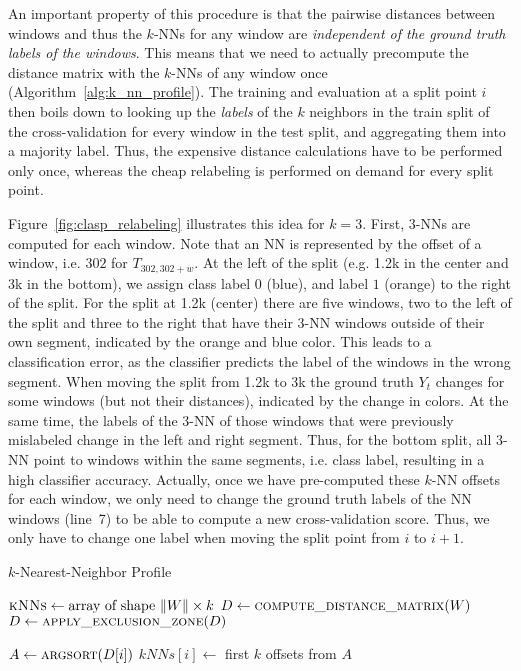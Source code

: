 \documentclass[pdflatex,sn-basic]{sn-jnl}
\begin{document}
An important property of this procedure is that the pairwise distances between windows and thus the $k$-NNs for any window are \emph{independent of the ground truth labels of the windows}. This means that we need to actually precompute the distance matrix with the $k$-NNs of any window once (Algorithm~\ref{alg:k_nn_profile}). The training and evaluation at a split point $i$ then boils down to looking up the \emph{labels} of the $k$ neighbors in the train split of the cross-validation for every window in the test split, and aggregating them into a majority label. Thus, the expensive distance calculations have to be performed only once, whereas the cheap relabeling is performed on demand for every split point.

Figure~\ref{fig:clasp_relabeling} illustrates this idea for $k=3$. First, $3$-NNs are computed for each window. Note that an NN is represented by the offset of a window, i.e. $302$ for $T_{302,302+w}$. At the left of the split (e.g. 1.2k in the center and 3k in the bottom), we assign class label $0$ (blue), and label $1$ (orange) to the right of the split. For the split at 1.2k (center) there are five windows, two to the left of the split and three to the right that have their $3$-NN windows outside of their own segment, indicated by the orange and blue color. This leads to a classification error, as the classifier predicts the label of the windows in the wrong segment. When moving the split from 1.2k to 3k the ground truth $Y_t$ changes for some windows (but not their distances), indicated by the change in colors. At the same time, the labels of the 3-NN of those windows that were previously mislabeled change in the left and right segment. Thus, for the bottom split, all 3-NN point to windows within the same segments, i.e. class label, resulting in a high classifier accuracy. Actually, once we have pre-computed these $k$-NN offsets for each window, we only need to change the ground truth labels of the NN windows (line~7) to be able to compute a new cross-validation score. Thus, we only have to change one label when moving the split point from $i$ to $i+1$. 

\begin{algorithm}[t]
	\caption{$k$-Nearest-Neighbor Profile}\label{alg:k_nn_profile}
	\begin{algorithmic}[1]
		    \State $\textsc{kNNs} \gets \text{array of shape } \|W\| \times k$
			\State $D \gets \textsc{compute\_distance\_matrix}(W)$ 
            \State $D \gets \textsc{apply\_exclusion\_zone}(D)$ 

				\State $A \gets \textsc{argsort}(D[i])$ 
				\State $kNNs[i] \gets $ first $k$ offsets from $A$
			\EndFor
			
			\State {}
		\EndProcedure 
	\end{algorithmic}
\end{algorithm}
\end{document}
